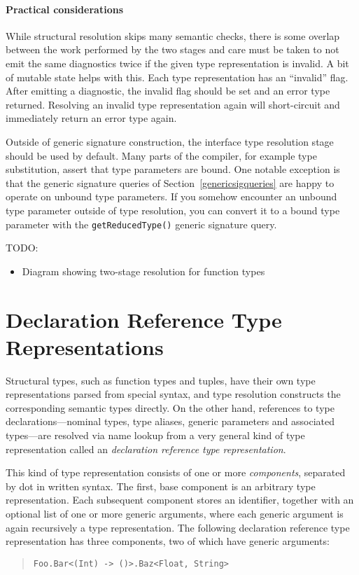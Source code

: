 \documentclass[a4paper,headsepline,bibliography=totoc,toc=flat,fleqn,twoside=semi]{scrbook}
\theoremstyle{definition}
\theoremstyle{definition}
\theoremstyle{definition}
\newcommand{\ifWIP}{\iffalse}
\begin{document}
\paragraph{Practical considerations}
While structural resolution skips many semantic checks, there is some overlap between the work performed by the two stages and care must be taken to not emit the same diagnostics twice if the given type representation is invalid. A bit of mutable state helps with this. Each type representation has an ``invalid'' flag. After emitting a diagnostic, the invalid flag should be set and an error type returned. Resolving an invalid type representation again will short-circuit and immediately return an error type again.

Outside of generic signature construction, the interface type resolution stage should be used by default. Many parts of the compiler, for example type substitution, assert that type parameters are bound. One notable exception is that the generic signature queries of Section~\ref{genericsigqueries} are happy to operate on unbound type parameters. If you somehow encounter an unbound type parameter outside of type resolution, you can convert it to a bound type parameter with the \texttt{getReducedType()} generic signature query.

TODO:
\begin{itemize}
\item Diagram showing two-stage resolution for function types
\end{itemize}
\fi

\section{Declaration Reference Type Representations}\label{declreftyperepr}

\ifWIP

Structural types, such as function types and tuples, have their own type representations parsed from special syntax, and type resolution constructs the corresponding semantic types directly. On the other hand, references to type declarations---nominal types, type aliases, generic parameters and associated types---are resolved via name lookup from a very general kind of type representation called an \emph{declaration reference type representation}.

This kind of type representation consists of one or more \emph{components}, separated by dot in written syntax. The first, base component is an arbitrary type representation. Each subsequent component stores an identifier, together with an optional list of one or more generic arguments, where each generic argument is again recursively a type representation. The following declaration reference type representation has three components, two of which have generic arguments:
\begin{quote}
\begin{verbatim}
Foo.Bar<(Int) -> ()>.Baz<Float, String>
\end{verbatim}
\end{quote}
\end{document}
